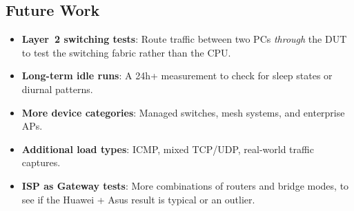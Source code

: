 \subsection{Future Work}

\begin{itemize}
    \item \textbf{Layer~2 switching tests}: Route traffic between two PCs \emph{through} the \ac{DUT} to test the switching fabric rather than the \ac{CPU}.
    \item \textbf{Long-term idle runs}: A 24h+ measurement to check for sleep states or diurnal patterns.
    \item \textbf{More device categories}: Managed switches, mesh systems, and enterprise APs.
    \item \textbf{Additional load types}: ICMP, mixed TCP/UDP, real-world traffic captures.
    \item \textbf{ISP as Gateway tests}: More combinations of routers and bridge modes, to see if the Huawei + Asus result is typical or an outlier.
\end{itemize}

